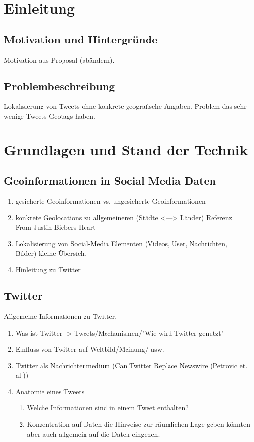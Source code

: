 \chapter{Einleitung}

\section{Motivation und Hintergründe}
Motivation aus Proposal (abändern).

\section{Problembeschreibung} 
Lokalisierung von Tweets ohne konkrete geografische Angaben. 
Problem das sehr wenige Tweets Geotags haben.

\chapter{Grundlagen und Stand der Technik}
	\section{Geoinformationen in Social Media Daten}
 		\begin{enumerate}
 			\item {} gesicherte Geoinformationen vs. ungesicherte Geoinformationen
 			\item konkrete Geolocations zu allgemeineren (Städte <---> Länder) Referenz: From Justin Biebers Heart 
 			\item Lokalisierung von Social-Media Elementen (Videos, User, Nachrichten, Bilder) kleine Übersicht
 			\item Hinleitung zu Twitter  
 		\end{enumerate}

	\section{Twitter}
		Allgemeine Informationen zu Twitter. 
		\begin{enumerate}
			\item Was ist Twitter -> Tweets/Mechanismen/"Wie wird Twitter genutzt"
			\item {} Einfluss von Twitter auf Weltbild/Meinung/ usw.
			\item Twitter als Nachrichtenmedium (Can Twitter Replace Newswire (Petrovic et. al ))
			\item Anatomie eines Tweets 
				\begin{enumerate}
					\item Welche Informationen sind in einem Tweet enthalten? 
					\item Konzentration auf Daten die Hinweise zur räumlichen Lage geben könnten aber auch allgemein auf die Daten eingehen.
				\end{enumerate}
		\end{enumerate}
		
